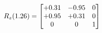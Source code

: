 \documentclass[preview]{standalone}
\begin{document}
\begin{align*}
\special{dvisvgm:raw <g id='unique000'>}R_{z}(1.26) = \begin{bmatrix}+0.31 & -0.95 & 0 \\+0.95 & +0.31 & 0 \\0 & 0 & 1\end{bmatrix}\special{dvisvgm:raw </g>}
\end{align*}
\end{document}
